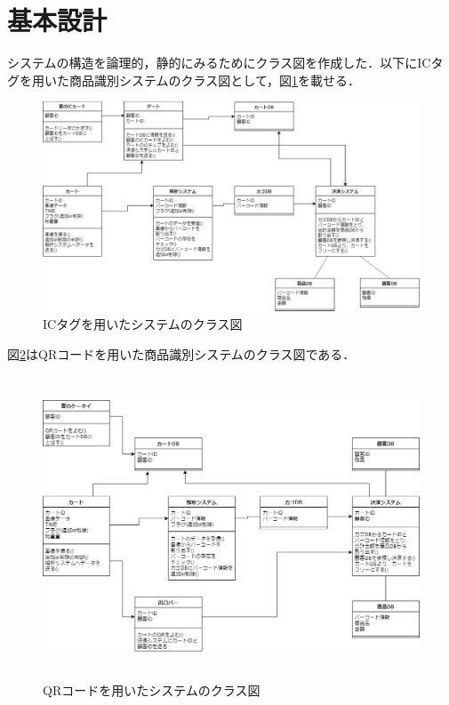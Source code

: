 


\section{基本設計}

システムの構造を論理的，静的にみるためにクラス図を作成した．以下にICタグを用いた商品識別システムのクラス図として，図\ref{class_ic}を載せる．

\begin{figure}[htbp]
\centering
\includegraphics[width=15cm]{./picture/class_ic.eps}
\caption{ICタグを用いたシステムのクラス図}
\label{class_ic}
\end{figure}


図\ref{class_qr}はQRコードを用いた商品識別システムのクラス図である．


\begin{figure}[htbp]
\centering
\includegraphics[height = 9cm,width=15cm]{./picture/class_qr.eps}
\caption{QRコードを用いたシステムのクラス図}
\label{class_qr}
\end{figure}


